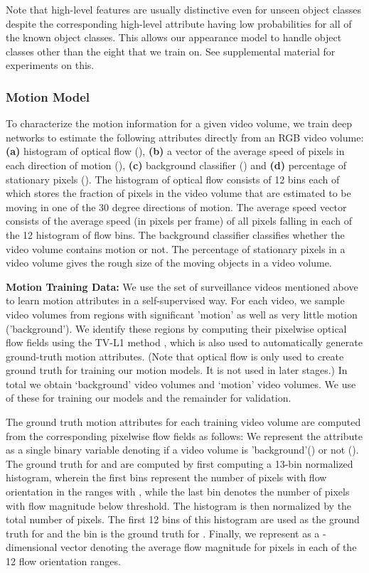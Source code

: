 Note that high-level features are usually distinctive even for unseen object classes despite the corresponding high-level attribute having low probabilities for all of the known object classes.  This allows our appearance model to handle object classes other than the eight that we train on.  See supplemental material for experiments on this.

\vspace{-5pt}
\subsubsection{Motion Model} To characterize the motion information for a given video volume, we train deep networks to estimate the following attributes directly from an RGB video volume: \textbf{(a)} histogram of optical flow  (), \textbf{(b)} a vector of the average speed of pixels in each direction of motion (), \textbf{(c)} background classifier () and \textbf{(d)} percentage of stationary pixels (). The histogram of optical flow consists of 12 bins each of which stores the fraction of pixels in the video volume that are estimated to be moving in one of the 30 degree directions of motion.  The average speed vector consists of the average speed (in pixels per frame) of all pixels falling in each of the 12 histogram of flow bins.  The background classifier classifies whether the video volume contains motion or not.  The percentage of stationary pixels in a video volume gives the rough size of the moving objects in a video volume.

\textbf{Motion Training Data:}
We use the set of surveillance videos mentioned above to learn motion attributes in a self-supervised way.
For each video, we sample video volumes from regions with significant 'motion' as well as very little motion ('background'). We identify these regions by computing their pixelwise optical flow fields using the TV-L1 method \cite{zach2007duality}, which is also used to automatically generate ground-truth motion attributes.  (Note that optical flow is only used to create ground truth for training our motion models.  It is not used in later stages.)  
In total we obtain  `background' video volumes and  `motion' video volumes. We use  of these for training our models and the remainder for validation.

The ground truth motion attributes for each training video volume are computed from the corresponding pixelwise flow fields as follows: 
We represent the  attribute as a single binary variable denoting if a video volume is 'background'() or not (). 
The ground truth for  and  are computed by first computing a 13-bin normalized histogram, wherein the first  bins represent the number of pixels with flow orientation in the ranges  with  , while the last bin denotes the number of pixels with flow magnitude below threshold.  The histogram is then normalized by the total number of pixels. 
The first 12 bins of this histogram are used as the ground truth for  and the  bin is the ground truth for .   Finally, we represent  as a -dimensional vector denoting the average flow magnitude for pixels in each of the 12 flow orientation ranges.

